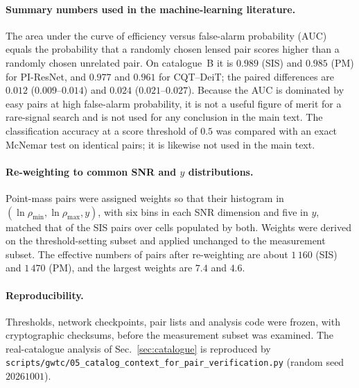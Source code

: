 \documentclass[aps,prd,twocolumn,superscriptaddress,nofootinbib,floatfix]{revtex4-2}
\newcommand{\PIR}{PI-ResNet}
\begin{document}
\paragraph*{Summary numbers used in the machine-learning literature.}
The area under the curve of efficiency versus false-alarm probability (AUC) equals the probability that a randomly chosen lensed pair scores higher than a randomly chosen unrelated pair.
On catalogue~B it is $0.989$ (SIS) and $0.985$ (PM) for \PIR{}, and $0.977$ and $0.961$ for CQT--DeiT; the paired differences are $0.012$ ($0.009$--$0.014$) and $0.024$ ($0.021$--$0.027$).
Because the AUC is dominated by easy pairs at high false-alarm probability, it is not a useful figure of merit for a rare-signal search and is not used for any conclusion in the main text.
The classification accuracy at a score threshold of $0.5$ was compared with an exact McNemar test on identical pairs; it is likewise not used in the main text.

\paragraph*{Re-weighting to common SNR and $y$ distributions.}
Point-mass pairs were assigned weights so that their histogram in $(\ln\rho_{\min},\ln\rho_{\max},y)$, with six bins in each SNR dimension and five in $y$, matched that of the SIS pairs over cells populated by both.
Weights were derived on the threshold-setting subset and applied unchanged to the measurement subset.
The effective numbers of pairs after re-weighting are about $1\,160$ (SIS) and $1\,470$ (PM), and the largest weights are $7.4$ and $4.6$.

\paragraph*{Reproducibility.}
Thresholds, network checkpoints, pair lists and analysis code were frozen, with cryptographic checksums, before the measurement subset was examined.
The real-catalogue analysis of Sec.~\ref{sec:catalogue} is reproduced by \nolinkurl{scripts/gwtc/05_catalog_context_for_pair_verification.py} (random seed $20261001$).


\end{document}
